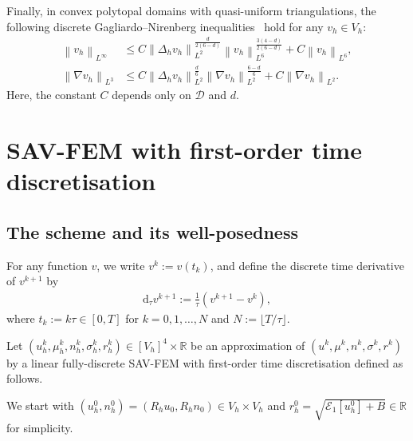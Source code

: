 \documentclass[11pt, reqno]{amsart}
\theoremstyle{definition}
\numberwithin{equation}{section}
\newcommand{\bb}{\mathbb}
\newcommand{\dtt}{\mathrm{d}_\tau}
\newcommand{\norm}[2]{\left\|{#1}\right\|_{#2}}
\begin{document}
Finally, in convex polytopal domains with quasi-uniform triangulations, the following discrete Gagliardo--Nirenberg inequalities~\cite{LiuCheWanWis17} hold for any $v_h\in V_h$:
\begin{align}
	\label{equ:disc lapl L infty}
	\norm{v_h}{L^\infty}
	&\leq
	C \norm{\Delta_h v_h}{L^2}^{\frac{d}{2(6-d)}}
	\norm{v_h}{L^6}^{\frac{3(4-d)}{2(6-d)}}
	+
	C\norm{v_h}{L^6},
	\\
	\label{equ:nab vh L3}
	\norm{\nabla v_h}{L^3}
	&\leq
	C\norm{\Delta_h v_h}{L^2}^{\frac{d}{6}} \norm{\nabla v_h}{L^2}^{\frac{6-d}{6}}
	+
	C\norm{\nabla v_h}{L^2}.
\end{align}
Here, the constant $C$ depends only on $\mathscr{D}$ and $d$.


\section{SAV-FEM with first-order time discretisation}\label{sec:savfemeuler}

\subsection{The scheme and its well-posedness}
{For any function $v$, we write $v^k:= v(t_k)$, and define the discrete time derivative of $v^{k+1}$ by
\begin{align*}
	\dtt v^{k+1} := \frac{1}{\tau} (v^{k+1}-v^k),
\end{align*}
where $t_k:=k\tau \in [0,T]$ for $k=0,1,\ldots,N$ and $N := \lfloor T/\tau \rfloor$.

Let $(u_h^k, \mu_h^k, n_h^k, \sigma_h^k, r_h^k)\in [V_h]^4 \times \bb{R}$ be an approximation of $(u^k,\mu^k,n^k,\sigma^k,r^k)$ by a linear fully-discrete SAV-FEM with first-order time discretisation defined as follows.}
We start with $(u_h^0, n_h^0)=(R_h u_0, R_h n_0) \in V_h\times V_h$ and $r_h^0=\sqrt{\mathcal E_1[u_h^0]+B} \in \bb{R}$ for simplicity. 
\end{document}
